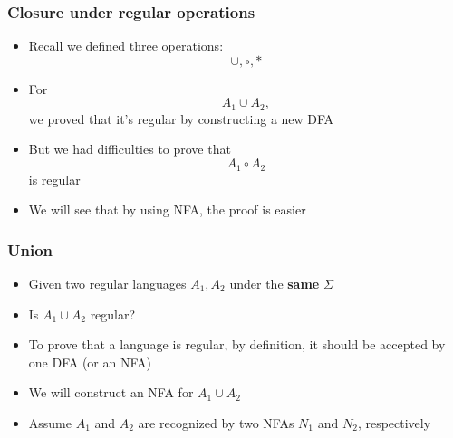 




\begin{frame}[allowframebreaks] \frametitle{Closure under regular operations}
  \begin{itemize}
  \item Recall we defined three operations:
    \begin{equation*}
    \cup, \circ, *
  \end{equation*}
\item For
  \begin{equation*}
    A_1 \cup A_2,
  \end{equation*}
  we proved that it's regular by constructing a new DFA
\item But we had difficulties to prove that
  \begin{equation*}
    A_1 \circ A_2
  \end{equation*}
  is regular
\item We will see that by using NFA, the proof is easier
\end{itemize}\end{frame} \begin{frame}[allowframebreaks] \frametitle{Union}
  \begin{itemize}  
\item Given two regular languages $A_1,A_2$ under the {\bf same }
$\Sigma$

\item [] Is $A_1 \cup A_2$ regular?
\item To prove that a language is regular, by
  definition, it should be accepted by one DFA (or an NFA)

  
\item [] We will construct an NFA for $A_1\cup A_2$
\item Assume $A_1$ and $A_2$ are recognized by two NFAs $N_1$
  and $N_2$, respectively


\end{itemize}
\end{frame}
